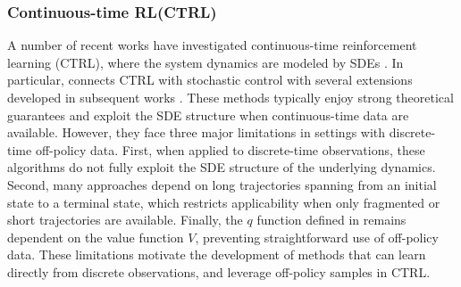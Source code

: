 \documentclass[12pt]{article}
\begin{document}
\subsubsection{Continuous-time RL(CTRL)}
A number of recent works have investigated continuous-time reinforcement learning (CTRL), where the system dynamics are modeled by SDEs \citep{jia2022policy-eval, jia2022policy-gradient, szpruch2024optimal, wang2020continuous, kim2020hamilton}.
In particular, \citep{wang2020reinforcement} connects CTRL with stochastic control with several extensions developed in subsequent works \citep{jia2022policy-gradient, szpruch2024optimal}.
These methods typically enjoy strong theoretical guarantees and exploit the SDE structure when continuous-time data are available. However, they face three major limitations in settings with discrete-time off-policy data. First, when applied to discrete-time observations, these algorithms do not fully exploit the SDE structure of the underlying dynamics. Second, many approaches depend on long trajectories spanning from an initial state to a terminal state, which restricts applicability when only fragmented or short trajectories are available. Finally, the $q$ function defined in \citep{jia2023q,tallec2019making, baird1994reinforcement} remains dependent on the value function $V$, preventing straightforward use of off-policy data. These limitations motivate the development of methods that can learn directly from discrete observations, and leverage off-policy samples in CTRL.

\end{document}
